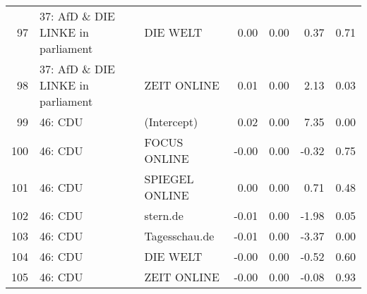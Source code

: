 \begin{table}[ht]
{\begin{tabular}{rllrrrr}
  97 & 37: AfD \& DIE LINKE in parliament & DIE WELT & 0.00 & 0.00 & 0.37 & 0.71 \\ 
  98 & 37: AfD \& DIE LINKE in parliament & ZEIT ONLINE & 0.01 & 0.00 & 2.13 & 0.03 \\ 
  99 & 46: CDU & (Intercept) & 0.02 & 0.00 & 7.35 & 0.00 \\ 
  100 & 46: CDU & FOCUS ONLINE & -0.00 & 0.00 & -0.32 & 0.75 \\ 
  101 & 46: CDU & SPIEGEL ONLINE & 0.00 & 0.00 & 0.71 & 0.48 \\ 
  102 & 46: CDU & stern.de & -0.01 & 0.00 & -1.98 & 0.05 \\ 
  103 & 46: CDU & Tagesschau.de & -0.01 & 0.00 & -3.37 & 0.00 \\ 
  104 & 46: CDU & DIE WELT & -0.00 & 0.00 & -0.52 & 0.60 \\ 
  105 & 46: CDU & ZEIT ONLINE & -0.00 & 0.00 & -0.08 & 0.93 \\ 
   \hline
\end{tabular}
}
\end{table}
